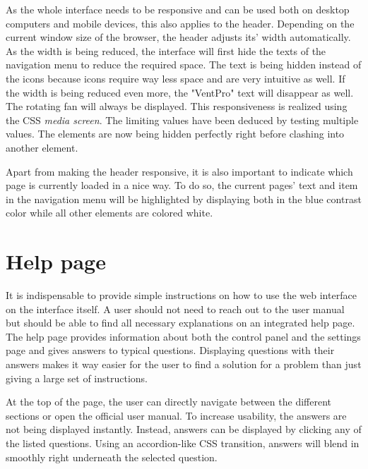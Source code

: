As the whole interface needs to be responsive and can be used both on desktop computers and mobile devices, this also applies to the header. Depending on the current window size of the browser, the header adjusts its' width automatically. As the width is being reduced, the interface will first hide the texts of the navigation menu to reduce the required space. The text is being hidden instead of the icons because icons require way less space and are very intuitive as well. If the width is being reduced even more, the "VentPro" text will disappear as well. The rotating fan will always be displayed. This responsiveness is realized using the CSS \textit{media screen}. The limiting values have been deduced by testing multiple values. The elements are now being hidden perfectly right before clashing into another element.

Apart from making the header responsive, it is also important to indicate which page is currently loaded in a nice way. To do so, the current pages' text and item in the navigation menu will be highlighted by displaying both in the blue contrast color while all other elements are colored white.





\section{Help page}
\label{sec:help_page}

It is indispensable to provide simple instructions on how to use the web interface on the interface itself. A user should not need to reach out to the user manual but should be able to find all necessary explanations on an integrated help page. The help page provides information about both the control panel and the settings page and gives answers to typical questions.  Displaying questions with their answers makes it way easier for the user to find a solution for a problem than just giving a large set of instructions.

At the top of the page, the user can directly navigate between the different sections or open the official user manual.  To increase usability, the answers are not being displayed instantly. Instead, answers can be displayed by clicking any of the listed questions.  Using an accordion-like CSS transition, answers will blend in smoothly right underneath the selected question. 




